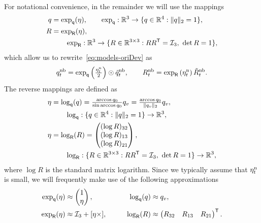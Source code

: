 For notational convenience, in the remainder we will use the mappings 
\begin{subequations}
\begin{align}
q &= \exp_\mathsf{q}(\eta), 
 \qquad \exp_\mathsf{q} : \mathbb{R}^3 \rightarrow \{ q \in \mathbb{R}^{4}: \| q \|_2 = 1 \}, \label{eq:models-expq-map} \\
R &= \exp_\mathsf{R}(\eta), \nonumber \\
&\qquad \exp_\mathsf{R} : \mathbb{R}^3 \rightarrow \{ R \in \mathbb{R}^{3 \times 3}: R R^{\mathsf{T}} = \mathcal{I}_3,~\det R = 1\}, \label{eq:models-expR-map}
\end{align} 
\label{eq:models-expqR-map}%
\end{subequations}%
which allow us to rewrite~\eqref{eq:models-oriDev} as 
    \begin{align}
    q^\text{nb}_t = \exp_\mathsf{q} \left( \tfrac{\eta_t^\text{n}}{2} \right) \odot \tilde{q}^\text{nb}_t, \qquad
    R^\text{nb}_t = \exp_\mathsf{R} \left( \eta_t^\text{n} \right) \tilde{R}^\text{nb}_t.
    \label{eq:models-oriDev_expqR}
    \end{align}
The reverse mappings are defined as
\begin{subequations}
\begin{align}
\eta &= \log_\mathsf{q} (q) = \tfrac{\arccos q_0}{\sin \arccos q_0} q_v = \tfrac{\arccos q_0}{\| q_v\|_2} q_v, \nonumber \\
&\qquad \log_\mathsf{q} : \{ q \in \mathbb{R}^{4}: \| q \|_2 = 1 \} \rightarrow \mathbb{R}^3, \label{eq:models-logq-map} \\
\eta &= \log_\mathsf{R} (R) = \begin{pmatrix} (\log R)_{32} \\ (\log R)_{13} \\ (\log R)_{21} \end{pmatrix}, \nonumber \\ 
&\qquad \log_\mathsf{R} : \{ R \in \mathbb{R}^{3 \times 3}: R R^{\mathsf{T}} = \mathcal{I}_3,~\det R = 1\} \rightarrow \mathbb{R}^3, \label{eq:models-logR-map}
\end{align}
\label{eq:models-logqR}%
\end{subequations}%
where $\log R$ is the standard matrix logarithm. Since we typically assume that $\eta_t^\text{n}$ is small, we will frequently make use of the following approximations
\begin{subequations}
\begin{align}
\exp_\mathsf{q} (\eta) &\approx \begin{pmatrix} 1 \\ \eta \end{pmatrix}, \qquad &\log_\mathsf{q} (q) &\approx q_v, \\
\exp_\mathsf{R} (\eta) &\approx \mathcal{I}_3 + [\eta \times], \qquad
&\log_\mathsf{R} (R) &\approx \begin{pmatrix} R_{32} & R_{13} & R_{21} \end{pmatrix}^{\mathsf{T}}.
\end{align}
\label{eq:models-logexpq-approx}
\end{subequations}

